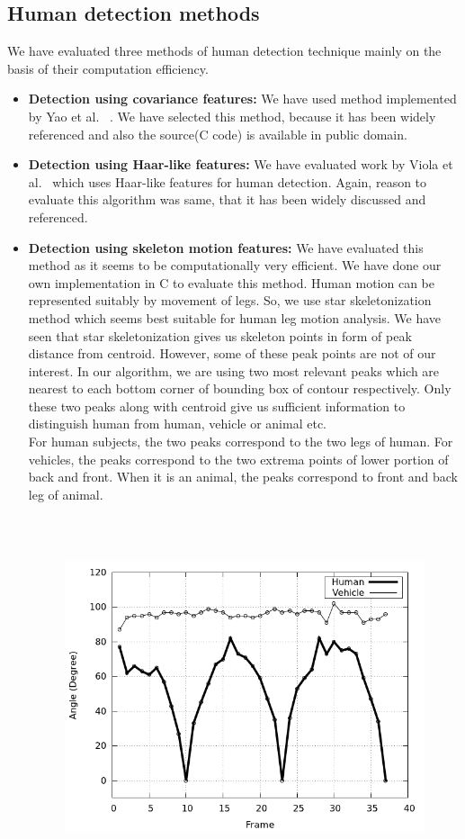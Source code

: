 \subsection{Human detection methods}
\indent We have evaluated three methods of human detection technique mainly on the
basis of their computation efficiency.
\begin{itemize}
\item \textbf{Detection using covariance features:} We have used method
 implemented by Yao et al. ~\cite{19}. We have selected this
 method, because it has been widely referenced and also the
 source(C code) is available in public domain.
\item \textbf{Detection using Haar-like features:} We have evaluated
 work by Viola et al.~\cite{16, 17} which uses Haar-like
 features for human detection. Again, reason to evaluate this
 algorithm was same, that it has been widely discussed and
 referenced.
\item \textbf{Detection using skeleton motion features:} We have
 evaluated this method as it seems to be computationally very
 efficient. We have done our own implementation in C to evaluate
 this method. Human motion can be represented suitably by
 movement of legs. So, we use star skeletonization method which
 seems best suitable for human leg motion analysis. We have seen
 that star skeletonization gives us skeleton points in form of peak
 distance from centroid. However, some of these peak points are
 not of our interest. In our algorithm, we are using two most relevant
 peaks which are nearest to each bottom corner of bounding box of
 contour respectively. Only these two peaks along with centroid
 give us sufficient information to distinguish human from
 human, vehicle or animal etc.\\
\indent For human subjects, the two peaks correspond to the two legs of
human. For vehicles, the peaks correspond to the two extrema points of
lower portion of back and front. When it is an animal, the peaks
correspond to front and back leg of animal.\\
\begin{figure}[!b]
\centering
\includegraphics[height=300pt]{Figures/angle_plot}

\end{figure}
\end{itemize}
